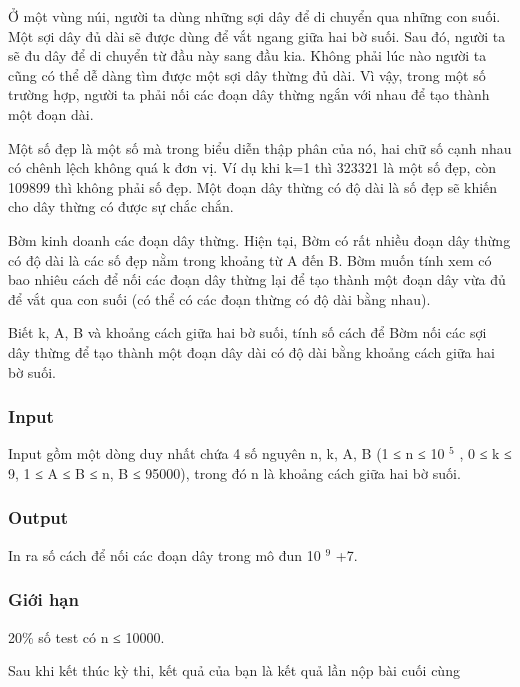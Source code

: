 



   Ở một vùng núi, người ta dùng những sợi dây để di chuyển qua những con suối. Một sợi dây đủ dài sẽ được dùng để vắt ngang giữa hai bờ suối. Sau đó, người ta sẽ đu dây để di chuyển từ đầu này sang đầu kia. Không phải lúc nào người ta cũng có thể dễ dàng tìm được một sợi dây thừng đủ dài. Vì vậy, trong một số trường hợp, người ta phải nối các đoạn dây thừng ngắn với nhau để tạo thành một đoạn dài.  

   Một số đẹp là một số mà trong biểu diễn thập phân của nó, hai chữ số cạnh nhau có chênh lệch không quá k đơn vị. Ví dụ khi k=1 thì 323321 là một số đẹp, còn 109899 thì không phải số đẹp. Một đoạn dây thừng có độ dài là số đẹp sẽ khiến cho dây thừng có được sự chắc chắn.  

   Bờm kinh doanh các đoạn dây thừng. Hiện tại, Bờm có rất nhiều đoạn dây thừng có độ dài là các số đẹp nằm trong khoảng từ A đến B. Bờm muốn tính xem có bao nhiêu cách để nối các đoạn dây thừng lại để tạo thành một đoạn dây vừa đủ để vắt qua con suối (có thể có các đoạn thừng có độ dài bằng nhau).  

   Biết k, A, B và khoảng cách giữa hai bờ suối, tính số cách để Bờm nối các sợi dây thừng để tạo thành một đoạn dây dài có độ dài bằng khoảng cách giữa hai bờ suối.  

\subsubsection{   Input  }

   Input gồm một dòng duy nhất chứa 4 số nguyên n, k, A, B (1 ≤ n ≤ 10   $^    5   $   , 0 ≤ k ≤ 9, 1 ≤ A ≤ B ≤ n, B ≤ 95000), trong đó n là khoảng cách giữa hai bờ suối.  

\subsubsection{   Output  }

   In ra số cách để nối các đoạn dây trong mô đun 10   $^    9   $   +7.  

\subsubsection{   Giới hạn  }

   20\% số test có n ≤ 10000.  

     Sau khi kết thúc kỳ thi, kết quả của bạn là kết quả lần nộp bài cuối cùng    

